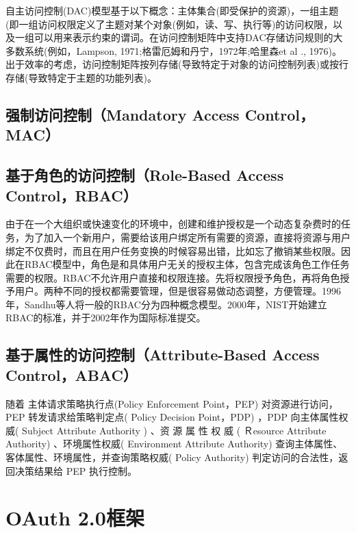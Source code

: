 自主访问控制(DAC)模型基于以下概念：主体集合(即受保护的资源)，一组主题(即一组访问权限定义了主题对某个对象(例如，读、写、执行等)的访问权限，以及一组可以用来表示约束的谓词。在访问控制矩阵中支持DAC存储访问规则的大多数系统(例如，Lampson, 1971;格雷厄姆和丹宁，1972年;哈里森et al ., 1976)。出于效率的考虑，访问控制矩阵按列存储(导致特定于对象的访问控制列表)或按行存储(导致特定于主题的功能列表)。

\subsection{强制访问控制（Mandatory Access Control，MAC）}

\subsection{基于角色的访问控制（Role-Based Access Control，RBAC）}

由于在一个大组织或快速变化的环境中，创建和维护授权是一个动态复杂费时的任务，为了加入一个新用户，需要给该用户绑定所有需要的资源，直接将资源与用户绑定不仅费时，而且在用户任务变换的时候容易出错，比如忘了撤销某些权限。因此在RBAC模型中，角色是和具体用户无关的授权主体，包含完成该角色工作任务需要的权限。RBAC不允许用户直接和权限连接。先将权限授予角色，再将角色授予用户。两种不同的授权都需要管理，但是很容易做动态调整，方便管理。1996年，Sandhu等人将一般的RBAC分为四种概念模型。2000年，NIST开始建立RBAC的标准，并于2002年作为国际标准提交。

\subsection{基于属性的访问控制（Attribute-Based Access Control，ABAC）}

随着
主体请求策略执行点(Policy Enforcement Point，PEP) 对资源进行访问，PEP 转发请求给策略判定点( Policy Decision Point，PDP) ，PDP 向主体属性权威( Subject Attribute Authority ) 、资 源 属 性 权 威 ( Ｒesource Attribute Authority) 、环境属性权威( Environment Attribute Authority) 查询主体属性、客体属性、环境属性，并查询策略权威( Policy Authority) 判定访问的合法性，返回决策结果给 PEP 执行控制。


\section{OAuth 2.0框架}

